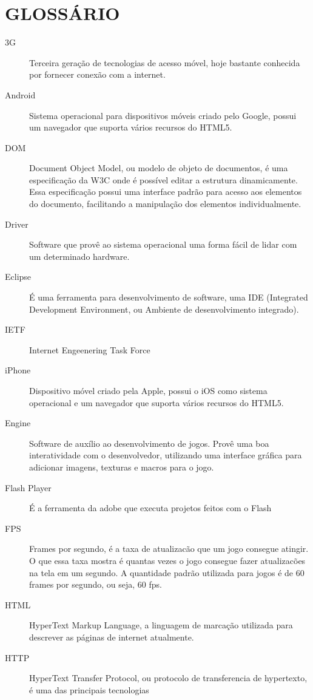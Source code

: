 
\section*{GLOSSÁRIO}

\begin{description}
\item[3G ] Terceira geração de tecnologias de acesso móvel, hoje
bastante conhecida por fornecer conexão com a internet.
\item[Android ] Sistema operacional para dispositivos móveis criado
pelo Google, possui um navegador que suporta vários recursos do HTML5.
\item[DOM ] Document Object Model, ou modelo de objeto de documentos,
é uma especificação da W3C onde é possível editar a estrutura
dinamicamente. Essa especificação possui uma interface padrão para
acesso aos elementos do documento, facilitando a manipulação dos
elementos individualmente.
\item[Driver ] Software que provê ao sistema operacional uma forma
fácil de lidar com um determinado hardware.
\item[Eclipse ] É uma ferramenta para desenvolvimento de software, uma
IDE (Integrated Development Environment, ou Ambiente de
desenvolvimento integrado).
\item[IETF ] Internet Engeenering Task Force
\item[iPhone ] Dispositivo móvel criado pela Apple, possui o iOS como
sistema operacional e um navegador que suporta vários recursos do HTML5.
\item[Engine ] Software de auxílio ao desenvolvimento de jogos. Provê
uma boa interatividade com o desenvolvedor, utilizando uma interface
gráfica para adicionar imagens, texturas e macros para o jogo.
\item[Flash Player ] É a ferramenta da adobe que executa projetos
feitos com o Flash
\item[FPS ] Frames por segundo, é a taxa de atualizacão que um jogo
consegue atingir. O que essa taxa mostra é quantas vezes o jogo
consegue fazer atualizacões na tela em um segundo. A quantidade padrão
utilizada para jogos é de 60 frames por segundo, ou seja, 60 fps.
\item[HTML ] HyperText Markup Language, a linguagem de marcação
utilizada para descrever as páginas de internet atualmente.
\item[HTTP ] HyperText Transfer Protocol, ou protocolo de
transferencia de hypertexto, é uma das principais tecnologias

\end{description}
